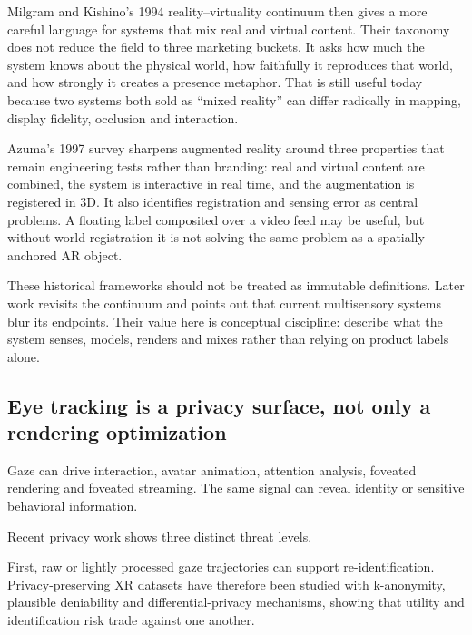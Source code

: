 Milgram and Kishino's 1994 reality--virtuality continuum then gives a more careful language for systems that mix real and virtual content. Their taxonomy does not reduce the field to three marketing buckets. It asks how much the system knows about the physical world, how faithfully it reproduces that world, and how strongly it creates a presence metaphor. That is still useful today because two systems both sold as ``mixed reality'' can differ radically in mapping, display fidelity, occlusion and interaction.

Azuma's 1997 survey sharpens augmented reality around three properties that remain engineering tests rather than branding: real and virtual content are combined, the system is interactive in real time, and the augmentation is registered in 3D. It also identifies registration and sensing error as central problems. A floating label composited over a video feed may be useful, but without world registration it is not solving the same problem as a spatially anchored AR object.

These historical frameworks should not be treated as immutable definitions. Later work revisits the continuum and points out that current multisensory systems blur its endpoints. Their value here is conceptual discipline: describe what the system senses, models, renders and mixes rather than relying on product labels alone.

\subsection{Eye tracking is a privacy surface, not only a rendering optimization}\label{04-visual-computing-ii-ch035-eye-tracking-is-a-privacy-surface-not-only-a-rendering-optimization}

\hypertarget{04-visual-computing-ii-ch035-eye-tracking-is-a-privacy-surface-not-only-a-rendering-optimization}{}

Gaze can drive interaction, avatar animation, attention analysis, foveated rendering and foveated streaming. The same signal can reveal identity or sensitive behavioral information.

Recent privacy work shows three distinct threat levels.

First, raw or lightly processed gaze trajectories can support re-identification. Privacy-preserving XR datasets have therefore been studied with k-anonymity, plausible deniability and differential-privacy mechanisms, showing that utility and identification risk trade against one another.

